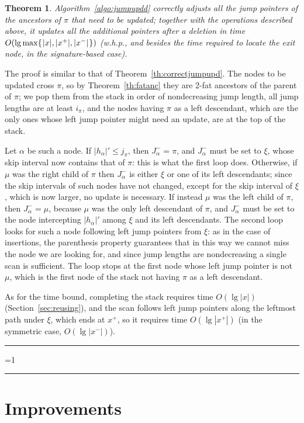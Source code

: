 \documentclass[a4paper]{article}
\newcounter{noqed}
\newcommand{\qed}{ \ifmmode\mbox{
}\fi\rule[-.05em]{.3em}{.7em}\setcounter{noqed}{0}}
\newenvironment{proof}[1][{}]{\noindent{\bf Proof#1.
}\setcounter{noqed}{1}}{\ifnum\value{noqed}=1\qed\fi\par\medskip}
\newtheorem{theorem}{Theorem}
\newcommand{\?}{\mskip1.5mu}
\begin{document}
\begin{theorem}
\label{th:correctjumpupdd}
Algorithm~\ref{algo:jumpupdd} correctly adjusts all the jump pointers of the ancestors of $\pi$ that need to be updated;
together with the operations described above, it updates all the additional pointers after a deletion
in time $O(\lg \max\{\?|x|, |x^+|, |x^-|\?\})$ (w.h.p., and besides the time required to locate the exit node, in the signature-based case).
\end{theorem}
\begin{proof}
The proof is similar to that of Theorem~\ref{th:correctjumpupd}. The nodes to be updated cross $\pi$, 
so by Theorem~\ref{th:fatanc} they are 2-fat ancestors of the parent of $\pi$; we pop them from the stack in order of
nondecreasing jump length, all jump lengths are at least $i_\pi$, and the nodes having $\pi$ as a left descendant, which are the only ones whose
left jump pointer might need an update, are at the top of the stack.

Let $\alpha$ be such a node. If $|h_\alpha|'\leq j_\pi$, then $J^-_\alpha=\pi$, and $J^-_\alpha$ must be set to $\xi$, 
whose skip interval now contains that of $\pi$: this is what the first loop does. Otherwise, if $\mu$ was the right child of $\pi$ then $J^-_\alpha$
is either $\xi$ or one of its left descendants; since the skip intervals of such nodes have not changed, except for the skip interval of $\xi$, 
which is now larger, no update is necessary. If instead $\mu$ was the left child of $\pi$, then $J^-_\alpha=\mu$, because $\mu$ was the only left descendant
of $\pi$, and $J^-_\alpha$ must be set to the node intercepting $|h_\alpha|'$ among $\xi$ and its left descendants. The second loop 
looks for such a node following left jump pointers from $\xi$: as in the case of insertions, 
the parenthesis property guarantees that in this way we cannot miss the node we are looking for, and since jump lengths are nondecreasing
a single scan is sufficient. The loop stops at the first node whose left jump pointer is not $\mu$, 
which is the first node of the stack not having $\pi$ as a left descendant.

As for the time bound, completing the stack requires time $O(\lg|x|)$ (Section~\ref{sec:reusing}), and
the scan follows left jump pointers along the leftmost path under $\xi$, which 
ends at $x^+$, so it requires time $O(\lg |x^+|)$ (in the symmetric case, $O(\lg|x^-|)$). \qed
\end{proof}


\section{Improvements}
\label{sec:improvements}
\end{document}
